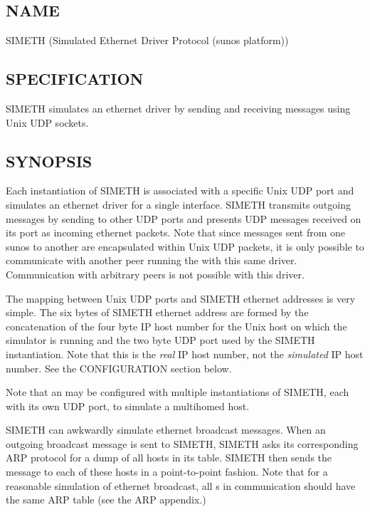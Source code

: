 %
%
%

\subsection*{NAME}

\noindent SIMETH (Simulated Ethernet Driver Protocol (sunos platform))

\subsection*{SPECIFICATION}

\noindent
SIMETH simulates an \xk{} ethernet driver by sending and receiving
messages using Unix UDP sockets. 


\subsection*{SYNOPSIS}

\noindent 
Each instantiation of SIMETH is associated with a specific Unix UDP
port and simulates an ethernet driver for a single interface.  SIMETH
transmits outgoing messages by sending to other UDP ports and presents
UDP messages received on its port as incoming ethernet packets.  Note
that since messages sent from one sunos \xk{} to another are
encapsulated within Unix UDP packets, it is only possible to communicate
with another peer running the \xk{} with this same driver.
Communication with arbitrary peers is not possible with this driver.

The mapping between Unix UDP ports and SIMETH ethernet addresses is
very simple.  The six bytes of SIMETH ethernet address are formed by
the concatenation of the four byte IP host number for the Unix host on
which the simulator is running and the two byte UDP port used
by the SIMETH instantiation.  Note that this is the {\em real} IP host
number, not the {\em simulated} IP host number.  See the CONFIGURATION
section below.

Note that an \xk{} may be configured with multiple instantiations of
SIMETH, each with its own UDP port, to simulate a multihomed host.

SIMETH can awkwardly simulate ethernet broadcast messages.  When an
outgoing broadcast message is sent to SIMETH, SIMETH asks its
corresponding  ARP
protocol  for a dump of all hosts in its table.
SIMETH then sends the message to each of these hosts in a
point-to-point fashion.  Note that for a reasonable simulation of
ethernet broadcast, all
\xk{}s in communication should have the same ARP table (see the ARP
appendix.) 

